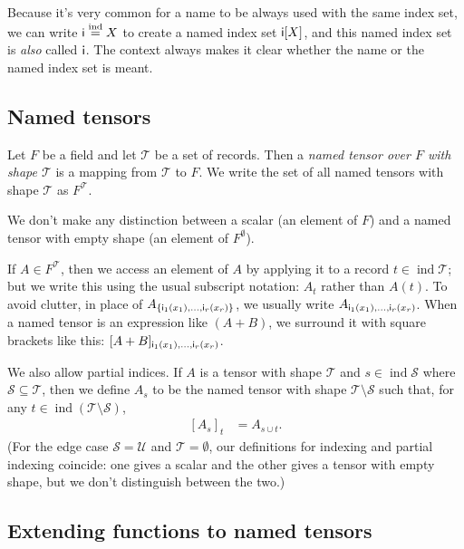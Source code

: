 \documentclass{article}
\newcommand{\tuple}[1]{\{#1\}}
\DeclareMathOperator{\tupleshape}{ind}
\begin{document}
Because it's very common for a name to be always used with the same index set, we can write $\mathsf{i} \overset{\textrm{ind}}= X$ to create a named index set $\mathsf{i}[X]$, and this named index set is \emph{also} called $\mathsf{i}$. The context always makes it clear whether the name or the named index set is meant.

\subsection{Named tensors}

Let $F$ be a field and let $\mathcal{T}$ be a set of records. Then a \emph{named tensor over $F$ with shape $\mathcal{T}$} is a mapping from $\mathcal{T}$ to $F$. We write the set of all named tensors with shape $\mathcal{T}$ as $F^{\mathcal{T}}$.

We don't make any distinction between a scalar (an element of $F$) and a named tensor with empty shape (an element of $F^\emptyset$).

If $A \in F^{\mathcal{T}}$, then we access an element of $A$ by applying it to a record $t \in \tupleshape\mathcal{T}$; but we write this using the usual subscript notation: $A_t$ rather than $A(t)$. To avoid clutter, in place of $A_{\tuple{\nidx{i\sub{1}}{x_1}, \ldots, \nidx{i\sub{r}}{x_r}}}$, we usually write $A_{\mathsf{i_\text{$1$}}(x_1), \ldots, \mathsf{i_\text{$r$}}(x_r)}$. When a named tensor is an expression like $(A+B)$, we surround it with square brackets like this: $[A+B]_{\mathsf{i_\text{$1$}}(x_1), \ldots, \mathsf{i_\text{$r$}}(x_r)}$.

We also allow partial indices. If $A$ is a tensor with shape $\mathcal{T}$ and $s \in \tupleshape \mathcal{S}$ where $\mathcal{S} \subseteq \mathcal{T}$, then we define $A_s$ to be the named tensor with shape $\mathcal{T} \setminus \mathcal{S}$ such that, for any $t \in \tupleshape (\mathcal{T} \setminus \mathcal{S})$,
\begin{align*}
\left[A_s\right]_t &= A_{s \cup t}.
\end{align*}
(For the edge case $\mathcal{S} = \mathcal{U}$ and $\mathcal{T} = \emptyset$, our definitions for indexing and partial indexing coincide: one gives a scalar and the other gives a tensor with empty shape, but we don't distinguish between the two.)

\subsection{Extending functions to named tensors}
\label{sec:tensorfunctions}
\end{document}
